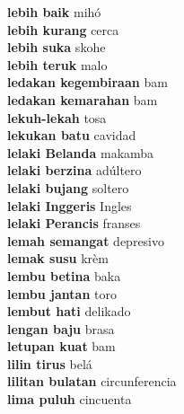 \textbf{ lebih baik  } mihó \\
\textbf{ lebih kurang  } cerca \\
\textbf{ lebih suka  } skohe \\
\textbf{ lebih teruk  } malo \\
\textbf{ ledakan kegembiraan  } bam \\
\textbf{ ledakan kemarahan  } bam \\
\textbf{ lekuh-lekah  } tosa \\
\textbf{ lekukan batu  } cavidad \\
\textbf{ lelaki Belanda  } makamba \\
\textbf{ lelaki berzina  } adúltero \\
\textbf{ lelaki bujang  } soltero \\
\textbf{ lelaki Inggeris  } Ingles \\
\textbf{ lelaki Perancis  } franses \\
\textbf{ lemah semangat  } depresivo \\
\textbf{ lemak susu  } krèm \\
\textbf{ lembu betina  } baka \\
\textbf{ lembu jantan  } toro \\
\textbf{ lembut hati  } delikado \\
\textbf{ lengan baju  } brasa \\
\textbf{ letupan kuat  } bam \\
\textbf{ lilin tirus  } belá \\
\textbf{ lilitan bulatan  } circunferencia \\
\textbf{ lima puluh  } cincuenta \\
